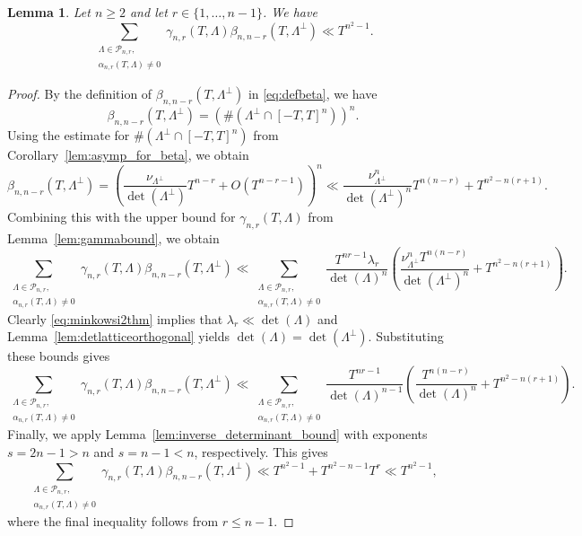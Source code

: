 \documentclass[11pt,reqno]{amsart}
\newtheorem{lem}[thm]{Lemma}
\theoremstyle{definition}
\theoremstyle{remark}
\numberwithin{equation}{section}
\numberwithin{thm}{section}
\numberwithin{table}{section}
\begin{document}
 
\begin{lem}\label{lem:gamma_beta_sum_bound}
    Let $n \ge 2$ and let $r \in \{1, \ldots, n-1\}$. We have
    \[
    \sum_{\substack{\Lambda \in \mathcal{P}_{n,r}, \\
    \alpha_{n,r}(T,\Lambda) \neq 0}}
    \gamma_{n,r}(T,\Lambda) \beta_{n,n-r}(T,\Lambda^\perp) \ll T^{n^2 - 1}.
    \]
\end{lem}
\begin{proof}
By the definition of $\beta_{n,n-r}(T, \Lambda^\perp)$ in \eqref{eq:defbeta}, we have
\begin{equation*}
    \beta_{n,n-r}(T, \Lambda^\perp)  = \left(\#(\Lambda^\perp \cap [-T,T]^n)\right)^n.
\end{equation*}
Using the estimate for $\#(\Lambda^\perp \cap [-T,T]^n)$ from Corollary~\ref{lem:asymp_for_beta}, we obtain
\begin{equation*}
    \beta_{n,n-r}(T, \Lambda^\perp) = \left(\frac{\nu_{\Lambda^\perp}}{\det(\Lambda^\perp)}T^{n-r} + O(T^{n-r - 1})\right)^n \ll \frac{\nu_{\Lambda^\perp}^n}{\det(\Lambda^\perp)^n}T^{n(n-r)} + T^{n^2 -n(r+1)}.
\end{equation*}
Combining this with the upper bound for $\gamma_{n,r}(T,\Lambda)$ from Lemma~\ref{lem:gammabound}, we obtain
\begin{equation*}
     \sum_{\substack{\Lambda \in \mathcal{P}_{n,r}, \\
        \alpha_{n,r}(T,\Lambda) \neq 0}}
        \gamma_{n,r}(T,\Lambda) \beta_{n,n-r}(T,\Lambda^\perp) \ll \sum_{\substack{\Lambda \in \mathcal{P}_{n,r}, \\
        \alpha_{n,r}(T,\Lambda) \neq 0}} \frac{T^{nr - 1}\lambda_r}{\det(\Lambda)^{n}} \left(\frac{\nu_{\Lambda^{\perp}}^nT^{n(n - r)}}{\det(\Lambda^{\perp})^n} + T^{n^2 - n(r + 1)}\right).
\end{equation*}
Clearly  \eqref{eq:minkowsi2thm} implies that $\lambda_r \ll \det (\Lambda)$ and 
 Lemma~\ref{lem:detlatticeorthogonal} yields $\det (\Lambda) = \det (\Lambda^{\perp})$.  Substituting these bounds gives
\begin{equation*}
     \sum_{\substack{\Lambda \in \mathcal{P}_{n,r}, \\
        \alpha_{n,r}(T,\Lambda) \neq 0}}
        \gamma_{n,r}(T,\Lambda) \beta_{n,n-r}(T,\Lambda^\perp) \ll \sum_{\substack{\Lambda \in \mathcal{P}_{n,r}, \\
        \alpha_{n,r}(T,\Lambda) \neq 0}} \frac{T^{nr - 1}}{\det(\Lambda)^{n - 1}} \left(\frac{T^{n(n - r)}}{\det(\Lambda)^n} + T^{n^2 - n(r + 1)}\right).
\end{equation*}
Finally, we apply Lemma~\ref{lem:inverse_determinant_bound} with exponents $s=2n-1>n$ and $s=n-1<n$, respectively. This gives 
%
\begin{equation*} 
\sum_{\substack{\Lambda \in \mathcal{P}_{n,r}, \\ \alpha_{n,r}(T,\Lambda) \neq 0}} \gamma_{n,r}(T,\Lambda) \beta_{n,n-r}(T,\Lambda^\perp) \ll T^{n^2-1} +T^{n^2-n-1}T^r \ll T^{n^2-1},
\end{equation*} 
%
where the final inequality follows from $r\leq n-1$. 
\end{proof}
\end{document}
